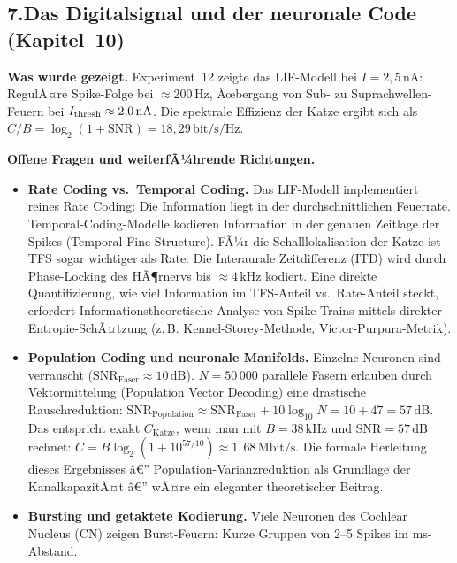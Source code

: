 ﻿\documentclass[12pt,a4paper,titlepage]{report}
\begin{document}
\subsection*{7.\enspace Das Digitalsignal und der neuronale Code
(Kapitel~10)}

\textbf{Was wurde gezeigt.}
Experiment~12 zeigte das LIF-Modell bei $I=2{,}5\,\mathrm{nA}$:
RegulÃ¤re Spike-Folge bei $\approx 200\,\mathrm{Hz}$,
Ãœbergang von Sub- zu Suprachwellen-Feuern bei $I_{\rm thresh} \approx 2{,}0\,\mathrm{nA}$.
Die spektrale Effizienz der Katze ergibt sich als
$C/B = \log_2(1+\mathrm{SNR}) = 18{,}29\,\mathrm{bit/s/Hz}$.

\textbf{Offene Fragen und weiterfÃ¼hrende Richtungen.}
\begin{itemize}[leftmargin=2em]
  \item \textbf{Rate Coding vs.\ Temporal Coding.}
    Das LIF-Modell implementiert reines Rate Coding:
    Die Information liegt in der durchschnittlichen Feuerrate.
    Temporal-Coding-Modelle kodieren Information in der genauen
    Zeitlage der Spikes (Temporal Fine Structure).
    FÃ¼r die Schalllokalisation der Katze ist TFS sogar wichtiger als
    Rate: Die Interaurale Zeitdifferenz (ITD) wird durch
    Phase-Locking des HÃ¶rnervs bis $\approx 4\,\mathrm{kHz}$ kodiert.
    Eine direkte Quantifizierung, wie viel Information im TFS-Anteil
    vs.\ Rate-Anteil steckt, erfordert Informationstheoretische
    Analyse von Spike-Trains mittels direkter Entropie-SchÃ¤tzung
    (z.\,B. Kennel-Storey-Methode, Victor-Purpura-Metrik).
  \item \textbf{Population Coding und neuronale Manifolds.}
    Einzelne Neuronen sind verrauscht ($\mathrm{SNR}_\text{Faser} \approx 10\,\mathrm{dB}$).
    $N=50\,000$ parallele Fasern erlauben durch Vektormittelung
    (Population Vector Decoding) eine drastische Rauschreduktion:
    $\mathrm{SNR}_\text{Population} \approx \mathrm{SNR}_\text{Faser} + 10\log_{10}N
    = 10 + 47 = 57\,\mathrm{dB}$.
    Das entspricht exakt $C_\mathrm{Katze}$, wenn man mit
    $B=38\,\mathrm{kHz}$ und $\mathrm{SNR}=57\,\mathrm{dB}$ rechnet:
    $C = B\log_2(1+10^{57/10}) \approx 1{,}68\,\mathrm{Mbit/s}$.
    Die formale Herleitung dieses Ergebnisses â€” Population-Varianzreduktion
    als Grundlage der KanalkapazitÃ¤t â€” wÃ¤re ein eleganter
    theoretischer Beitrag.
  \item \textbf{Bursting und getaktete Kodierung.}
    Viele Neuronen des Cochlear Nucleus (CN) zeigen Burst-Feuern:
    Kurze Gruppen von 2--5 Spikes im $\mathrm{ms}$-Abstand.

\end{itemize}
\end{document}
